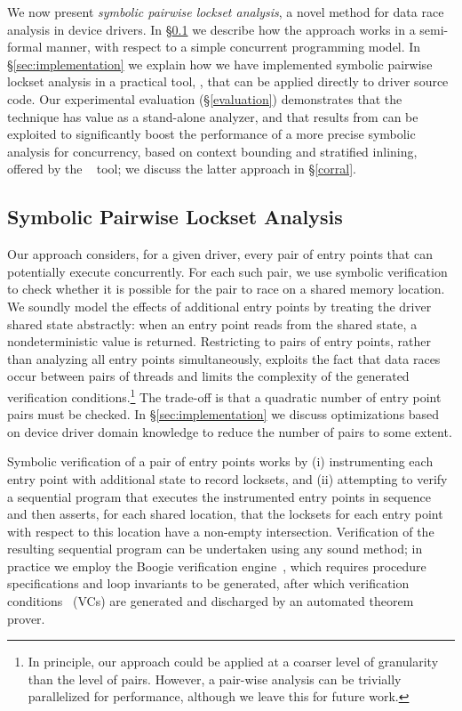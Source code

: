 
We now present \emph{symbolic pairwise lockset analysis}, a novel method for data race analysis in device drivers.  In \S\ref{sec:symbolicpairwise} we describe how the approach works in a semi-formal manner, with respect to a simple concurrent programming model.  In \S\ref{sec:implementation} we explain how we have implemented symbolic pairwise lockset analysis in a practical tool, \whoop, that can be applied directly to driver source code.
%
Our experimental evaluation (\S\ref{evaluation}) demonstrates that the \whoop technique has value as a stand-alone analyzer, and that results from \whoop can be exploited to significantly boost the performance of a more precise symbolic analysis for concurrency, based on context bounding and stratified inlining, offered by the \corral~\cite{lal2012corral} tool; we discuss the latter approach in \S\ref{corral}.

\subsection{Symbolic Pairwise Lockset Analysis}
\label{sec:symbolicpairwise}

Our approach considers, for a given driver, every pair of entry points that can potentially execute concurrently.  For each such pair, we use symbolic verification to check whether it is possible for the pair to race on a shared memory location. We soundly model the effects of additional entry points by treating the driver shared state abstractly: when an entry point reads from the shared state, a nondeterministic value is returned.  Restricting to pairs of entry points, rather than analyzing all entry points simultaneously, exploits the fact that data races occur between pairs of threads and limits the complexity of the generated verification conditions.\footnote{In principle, our approach could be applied at a coarser level of granularity than the level of pairs. However, a pair-wise analysis can be trivially parallelized for performance, although we leave this for future work.}  The trade-off is that a quadratic number of entry point pairs must be checked.  In \S\ref{sec:implementation} we discuss optimizations based on device driver domain knowledge to reduce the number of pairs to some extent.

Symbolic verification of a pair of entry points works by (i) instrumenting each entry point with additional state to record locksets, and (ii) attempting to verify a sequential program that executes the instrumented entry points in sequence and then asserts, for each shared location, that the locksets for each entry point with respect to this location have a non-empty intersection.  Verification of the resulting sequential program can be undertaken using any sound method; in practice we employ the Boogie verification engine~\cite{barnett2006boogie}, which requires procedure specifications and loop invariants to be generated, after which verification conditions~\cite{barnett2005weakest} (VCs) are generated and discharged by an automated theorem prover.


